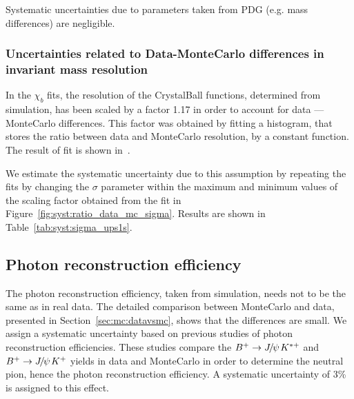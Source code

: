 Systematic uncertainties due to parameters taken from PDG (e.g. mass differences)
are negligible.
 
\subsubsection{Uncertainties related to Data-MonteCarlo differences in invariant mass resolution}
 
In the $\chi_b$ fits, the resolution of the CrystalBall functions, determined
from simulation, has been scaled by a factor 1.17 in order to account for data
--- MonteCarlo differences. This factor was obtained by fitting a histogram,
that stores the ratio between data and MonteCarlo resolution, by a constant
function. The result of fit is shown in~.
 
% 


We estimate the systematic uncertainty due to this assumption by repeating the
fits by changing the $\sigma$ parameter within the maximum and minimum values of
the scaling factor obtained from the fit in Figure~\ref{fig:syst:ratio_data_mc_sigma}.
Results are shown in Table~\ref{tab:syst:sigma_ups1s}.





\subsection{Photon reconstruction efficiency}
The photon reconstruction efficiency, taken from simulation, needs not to be
the same as in real data. The detailed comparison between MonteCarlo and data,
presented in Section~\ref{sec:mc:datavsmc}, shows that the differences
are small. We assign a systematic uncertainty based on previous studies of
photon reconstruction efficiencies. These studies compare the
$B^+ \rightarrow {\ensuremath{{J\mskip -3mu/\mskip -2mu\psi\mskip 2mu}}} K^{*+}$ and $B^+ \rightarrow {\ensuremath{{J\mskip -3mu/\mskip -2mu\psi\mskip 2mu}}} K^+$ yields in data and MonteCarlo in
order to determine the neutral pion, hence the photon  reconstruction
efficiency. A systematic uncertainty of 3\% is assigned to this effect.


